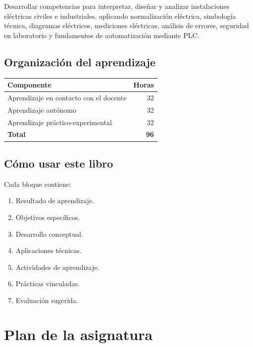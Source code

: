\documentclass[
  spanish,
  letterpaper,
  DIV=11,
  numbers=noendperiod]{scrreprt}
\newcounter{none} %
\providecommand{\tightlist}{%
  \setlength{\itemsep}{0pt}\setlength{\parskip}{0pt}}
\begin{document}
Desarrollar competencias para interpretar, diseñar y analizar
instalaciones eléctricas civiles e industriales, aplicando normalización
eléctrica, simbología técnica, diagramas eléctricos, mediciones
eléctricas, análisis de errores, seguridad en laboratorio y fundamentos
de automatización mediante PLC.

\section{Organización del
aprendizaje}\label{organizaciuxf3n-del-aprendizaje}

{\def\LTcaptype{none} %
\begin{longtable}[]{@{}lr@{}}
\toprule\noalign{}
Componente & Horas \\
\midrule\noalign{}
\endhead
\bottomrule\noalign{}
\endlastfoot
Aprendizaje en contacto con el docente & 32 \\
Aprendizaje autónomo & 32 \\
Aprendizaje práctico-experimental & 32 \\
\textbf{Total} & \textbf{96} \\
\end{longtable}
}

\section{Cómo usar este libro}\label{cuxf3mo-usar-este-libro}

Cada bloque contiene:

\begin{enumerate}
\def\labelenumi{\arabic{enumi}.}
\tightlist
\item
  Resultado de aprendizaje.
\item
  Objetivos específicos.
\item
  Desarrollo conceptual.
\item
  Aplicaciones técnicas.
\item
  Actividades de aprendizaje.
\item
  Prácticas vinculadas.
\item
  Evaluación sugerida.
\end{enumerate}


\chapter{Plan de la asignatura}\label{plan-de-la-asignatura}
\end{document}
